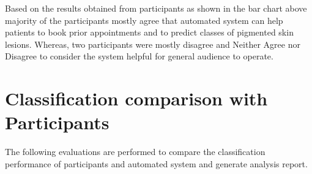 Based on the results obtained from participants as shown in the bar chart 
above majority of the participants mostly agree that automated system can 
help patients to book prior appointments and to predict classes of pigmented skin 
lesions. Whereas, two participants were mostly disagree and Neither Agree nor Disagree
to consider the system helpful for general audience to operate.

\pagebreak
\section{Classification comparison with Participants}
The following evaluations are performed to compare the classification performance 
of participants and automated system and generate analysis report. 
